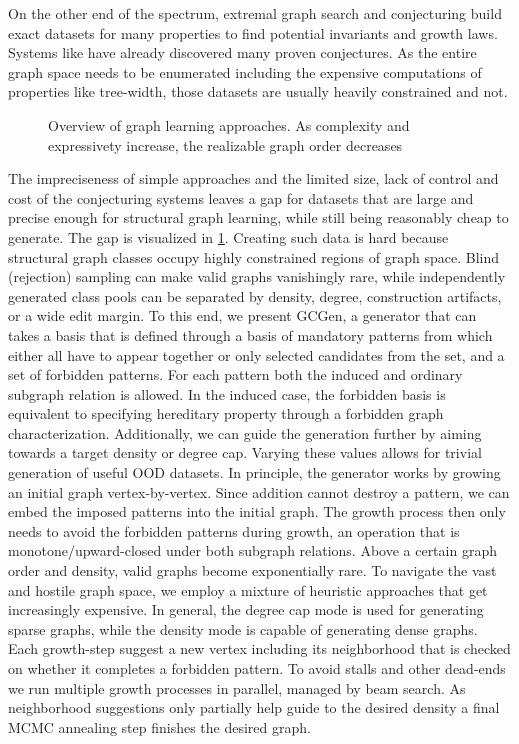 \documentclass[11pt,twocolumn]{article}
\newcommand{\gen}{GCGen\xspace}
\begin{document}
On the other end of the spectrum, extremal graph search and conjecturing build exact datasets for many properties to find potential invariants and growth laws.
Systems like \cite{devillezPHOEGHelpsObtain2019, davilaAutomatedConjecturingTxgraffiti2025, hansenAutoGraphiXAutomatedSystem2000} have already discovered many proven conjectures.
As the entire graph space needs to be enumerated including the expensive computations of properties like tree-width, those datasets are usually heavily constrained and not.

\begin{figure}
	\centering
	
	\caption{Overview of graph learning approaches. As complexity and expressivety increase, the realizable graph order decreases}
	\label{fig:overview}
\end{figure}

The impreciseness of simple approaches and the limited size, lack of control and cost of the conjecturing systems leaves a gap for datasets that are large and precise enough for structural graph learning, while still being reasonably cheap to generate. The gap is visualized in \cref{fig:overview}.
Creating such data is hard because structural graph classes occupy highly constrained regions of graph space.
Blind (rejection) sampling can make valid graphs vanishingly rare, while independently generated class pools can be separated by density, degree, construction artifacts, or a wide edit margin.
To this end, we present \gen, a generator that can takes a basis that is defined through a basis of mandatory patterns from which either all have to appear together or only selected candidates from the set, and a set of forbidden patterns.
For each pattern both the induced and ordinary subgraph relation is allowed.
In the induced case, the forbidden basis is equivalent to specifying hereditary property through a forbidden graph characterization.
Additionally, we can guide the generation further by aiming towards a target density or degree cap.
Varying these values allows for trivial generation of useful OOD datasets.
In principle, the generator works by growing an initial graph vertex-by-vertex.
Since addition cannot destroy a pattern, we can embed the imposed patterns into the initial graph.
The growth process then only needs to avoid the forbidden patterns during growth, an operation that is monotone/upward-closed under both subgraph relations.
Above a certain graph order and density, valid graphs become exponentially rare.
To navigate the vast and hostile graph space, we employ a mixture of heuristic approaches that get increasingly expensive.
In general, the degree cap mode is used for generating sparse graphs, while the density mode is capable of generating dense graphs.
Each growth-step suggest a new vertex including its neighborhood that is checked on whether it completes a forbidden pattern.
To avoid stalls and other dead-ends we run multiple growth processes in parallel, managed by beam search.
As neighborhood suggestions only partially help guide to the desired density a final MCMC annealing step finishes the desired graph.
\end{document}
